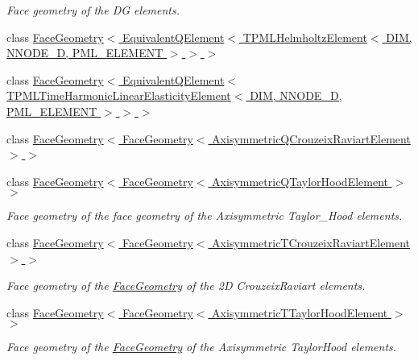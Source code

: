 \begin{DoxyCompactItemize}
\begin{DoxyCompactList}\small\item\em Face geometry of the DG elements. \end{DoxyCompactList}\item 
class \hyperlink{classoomph_1_1FaceGeometry_3_01EquivalentQElement_3_01TPMLHelmholtzElement_3_01DIM_00_01NNODE__1d6a940810257b7d5eb8bc5fb172f4662}{Face\+Geometry$<$ Equivalent\+Q\+Element$<$ T\+P\+M\+L\+Helmholtz\+Element$<$ D\+I\+M, N\+N\+O\+D\+E\+\_\+D, P\+M\+L\+\_\+\+E\+L\+E\+M\+E\+N\+T $>$ $>$ $>$}
\item 
class \hyperlink{classoomph_1_1FaceGeometry_3_01EquivalentQElement_3_01TPMLTimeHarmonicLinearElasticityElement_3_9956b642c3d365104321ed7a38eb862c}{Face\+Geometry$<$ Equivalent\+Q\+Element$<$ T\+P\+M\+L\+Time\+Harmonic\+Linear\+Elasticity\+Element$<$ D\+I\+M, N\+N\+O\+D\+E\+\_\+D, P\+M\+L\+\_\+\+E\+L\+E\+M\+E\+N\+T $>$ $>$ $>$}
\item 
class \hyperlink{classoomph_1_1FaceGeometry_3_01FaceGeometry_3_01AxisymmetricQCrouzeixRaviartElement_01_4_01_4}{Face\+Geometry$<$ Face\+Geometry$<$ Axisymmetric\+Q\+Crouzeix\+Raviart\+Element $>$ $>$}
\item 
class \hyperlink{classoomph_1_1FaceGeometry_3_01FaceGeometry_3_01AxisymmetricQTaylorHoodElement_01_4_01_4}{Face\+Geometry$<$ Face\+Geometry$<$ Axisymmetric\+Q\+Taylor\+Hood\+Element $>$ $>$}
\begin{DoxyCompactList}\small\item\em Face geometry of the face geometry of the Axisymmetric Taylor\+\_\+\+Hood elements. \end{DoxyCompactList}\item 
class \hyperlink{classoomph_1_1FaceGeometry_3_01FaceGeometry_3_01AxisymmetricTCrouzeixRaviartElement_01_4_01_4}{Face\+Geometry$<$ Face\+Geometry$<$ Axisymmetric\+T\+Crouzeix\+Raviart\+Element $>$ $>$}
\begin{DoxyCompactList}\small\item\em Face geometry of the \hyperlink{classoomph_1_1FaceGeometry}{Face\+Geometry} of the 2D Crouzeix\+Raviart elements. \end{DoxyCompactList}\item 
class \hyperlink{classoomph_1_1FaceGeometry_3_01FaceGeometry_3_01AxisymmetricTTaylorHoodElement_01_4_01_4}{Face\+Geometry$<$ Face\+Geometry$<$ Axisymmetric\+T\+Taylor\+Hood\+Element $>$ $>$}
\begin{DoxyCompactList}\small\item\em Face geometry of the \hyperlink{classoomph_1_1FaceGeometry}{Face\+Geometry} of the Axisymmetric Taylor\+Hood elements. \end{DoxyCompactList}\item 

\end{DoxyCompactItemize}
